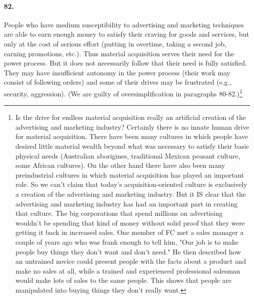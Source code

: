 \documentclass[12pt]{book}
\begin{document}
\paragraph{82.} People who have medium susceptibility to advertising and marketing techniques are able to earn enough money to satisfy their craving for goods and services, but only at the cost of serious effort (putting in overtime, taking a second job, earning promotions, etc.). Thus material acquisition serves their need for the power process. But it does not necessarily follow that their need is fully satisfied. They may have insufficient autonomy in the power process (their work may consist of following orders) and some of their drives may be frustrated (e.g., security, aggression). (We are guilty of oversimplification in paragraphs 80-82.)\footnote{Is the drive for endless material acquisition really an artificial creation of the advertising and marketing industry? Certainly there is no innate human drive for material acquisition. There have been many cultures in which people have desired little material wealth beyond what was necessary to satisfy their basic physical needs (Australian aborigines, traditional Mexican peasant culture, some African cultures). On the other hand there have also been many preindustrial cultures in which material acquisition has played an important role. So we can't claim that today's acquisition-oriented culture is exclusively a creation of the advertising and marketing industry. But it IS clear that the advertising and marketing industry has had an important part in creating that culture. The big corporations that spend millions on advertising wouldn't be spending that kind of money without solid proof that they were getting it back in increased sales. One member of FC met a sales manager a couple of years ago who was frank enough to tell him, "Our job is to make people buy things they don't want and don't need." He then described how an untrained novice could present people with the facts about a product and make no sales at all, while a trained and experienced professional salesman would make lots of sales to the same people. This shows that people are manipulated into buying things they don't really want.}
\end{document}
